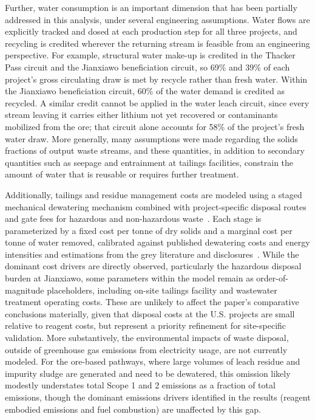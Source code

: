 \documentclass{article}
\renewcommand\_{\textunderscore\allowbreak}
\begin{document}
Further, water consumption is an important dimension that has been partially addressed in this analysis, under several engineering assumptions. Water flows are explicitly tracked and dosed at each production step for all three projects, and recycling is credited wherever the returning stream is feasible from an engineering perspective. For example, structural water make-up is credited in the Thacker Pass circuit and the Jianxiawo beneficiation circuit, so 69\% and 39\% of each project's gross circulating draw is met by recycle rather than fresh water. Within the Jianxiawo beneficiation circuit, 60\% of the water demand is credited as recycled. A similar credit cannot be applied  in the water leach circuit, since every stream leaving it carries either lithium not yet recovered or contaminants mobilized from the ore; that circuit alone accounts for 58\% of the project's fresh water draw. More generally, many assumptions were made regarding the solids fractions of output waste streams, and these quantities, in addition to secondary quantities such as seepage and entrainment at tailings facilities, constrain the amount of water that is reusable or requires further treatment. 

Additionally, tailings and residue management costs are modeled using a staged mechanical dewatering mechanism combined with project-specific disposal routes~\cite{sgscanadaincSK1300Technical2024,srkconsultingSECTechnicalReport2023a} and gate fees for hazardous and non-hazardous waste~\cite{nationaldevelopmentandreformcommission2024}. Each stage is parameterized by a fixed cost per tonne of dry solids and a marginal cost per tonne of water removed, calibrated against published dewatering costs and energy intensities and estimations from the grey literature and disclosures~\cite{carneiroConceptualCostComparison2018, klohncrippenbergerStudyTailingsManagement2017, usepaBiosolidsTechnologyFact2000, usepaBiosolidsTechnologyFact2003, usepaBiosolidsTechSheetPlatePress2000, crystalFilterPressedDryStacking2018, smithEnergyConventionalWater2017, sgscanadaincSK1300Technical2024, silvercorpmetalsinc.TailingsStorageFacility2025}. While the dominant cost drivers are directly observed, particularly the hazardous disposal burden at Jianxiawo, some parameters within the model remain as order-of-magnitude placeholders, including on-site tailings facility and wastewater treatment operating costs. These are unlikely to affect the paper's comparative conclusions materially, given that disposal costs at the U.S. projects are small relative to reagent costs, but represent a priority refinement for site-specific validation. More substantively, the environmental impacts of waste disposal, outside of greenhouse gas emissions from electricity usage, are not currently modeled. For the ore-based pathways, where large volumes of leach residue and impurity sludge are generated and need to be dewatered, this omission likely modestly understates total Scope 1 and 2 emissions as a fraction of total emissions, though the dominant emissions drivers identified in the results (reagent embodied emissions and fuel combustion) are unaffected by this gap.
\end{document}

